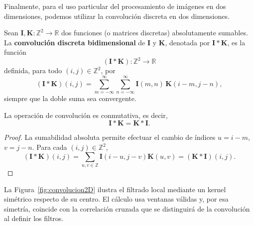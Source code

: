 Finalmente, para el uso particular del procesamiento de imágenes en dos dimensiones, podemos utilizar la convolución discreta en dos dimensiones.

\begin{definition}
\label{def:convolucion-discreta-2d}
    Sean $\mathbf{I}, \mathbf{K} : \mathbb{Z}^2 \to \mathbb{R}$ dos funciones (o matrices discretas) absolutamente sumables.
    La \textbf{convolución discreta bidimensional} de $\mathbf{I}$ y $\mathbf{K}$, denotada por $\mathbf{I} \ast \mathbf{K}$, es la función
    \[
        (\mathbf{I} \ast \mathbf{K}) : \mathbb{Z}^2 \to \mathbb{R}
    \]
    definida, para todo $(i,j) \in \mathbb{Z}^2$, por
    \[
        (\mathbf{I} \ast \mathbf{K})(i,j) = \sum_{m=-\infty}^{\infty} \sum_{n=-\infty}^{\infty}
        \mathbf{I}(m,n)\, \mathbf{K}(i - m, j - n),
    \]
    siempre que la doble suma sea convergente.
\end{definition}

\begin{observation}
\label{obs:conmutatividad-convolucion}
    La operación de convolución es conmutativa, es decir,
    \[
        \mathbf{I} \ast \mathbf{K} = \mathbf{K} \ast \mathbf{I}.
    \]
\end{observation}

\begin{proof}
La sumabilidad absoluta permite efectuar el cambio de índices $u=i-m$, $v=j-n$. Para cada $(i,j)\in\mathbb Z^2$,
\[
(\mathbf I\ast\mathbf K)(i,j)
=\sum_{u,v\in\mathbb Z}\mathbf I(i-u,j-v)\mathbf K(u,v)
=(\mathbf K\ast\mathbf I)(i,j).
\]
\end{proof}

La Figura~\ref{fig:convolucion2D} ilustra el filtrado local mediante un kernel simétrico respecto de su centro. El cálculo usa ventanas válidas y, por esa simetría, coincide con la correlación cruzada que se distinguirá de la convolución al definir los filtros.

